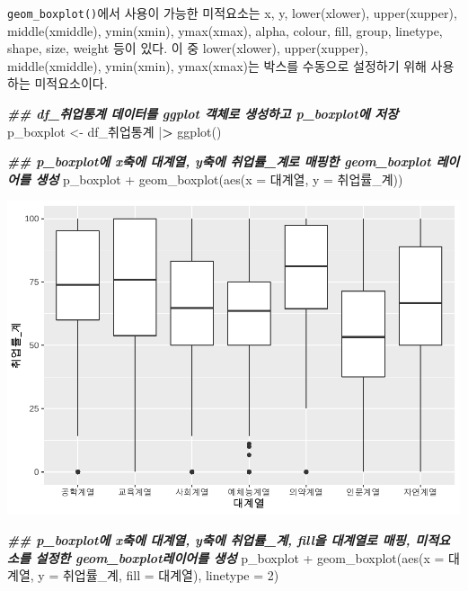 \documentclass[
]{article}
\newenvironment{Shaded}{\begin{snugshade}}{\end{snugshade}}
\newcommand{\AttributeTok}[1]{\textcolor[rgb]{0.77,0.63,0.00}{#1}}
\newcommand{\DecValTok}[1]{\textcolor[rgb]{0.00,0.00,0.81}{#1}}
\newcommand{\DocumentationTok}[1]{\textcolor[rgb]{0.56,0.35,0.01}{\textbf{\textit{#1}}}}
\newcommand{\ErrorTok}[1]{\textcolor[rgb]{0.64,0.00,0.00}{\textbf{#1}}}
\newcommand{\FunctionTok}[1]{\textcolor[rgb]{0.00,0.00,0.00}{#1}}
\newcommand{\NormalTok}[1]{#1}
\newcommand{\OtherTok}[1]{\textcolor[rgb]{0.56,0.35,0.01}{#1}}
\newcommand{\SpecialCharTok}[1]{\textcolor[rgb]{0.00,0.00,0.00}{#1}}
\begin{document}
\texttt{geom\_boxplot()}에서 사용이 가능한 미적요소는 x, y, lower(xlower), upper(xupper), middle(xmiddle), ymin(xmin), ymax(xmax), alpha, colour, fill, group, linetype, shape, size, weight 등이 있다. 이 중 lower(xlower), upper(xupper), middle(xmiddle), ymin(xmin), ymax(xmax)는 박스를 수동으로 설정하기 위해 사용하는 미적요소이다.

\begin{Shaded}
\begin{Highlighting}[]
\DocumentationTok{\#\#  df\_취업통계 데이터를 ggplot 객체로 생성하고 p\_boxplot에 저장}
\NormalTok{p\_boxplot }\OtherTok{\textless{}{-}}\NormalTok{ df\_취업통계 }\SpecialCharTok{|}\ErrorTok{\textgreater{}}
  \FunctionTok{ggplot}\NormalTok{()}

\DocumentationTok{\#\# p\_boxplot에 x축에 대계열, y축에 취업률\_계로 매핑한 geom\_boxplot 레이어를 생성}
\NormalTok{p\_boxplot }\SpecialCharTok{+} 
  \FunctionTok{geom\_boxplot}\NormalTok{(}\FunctionTok{aes}\NormalTok{(}\AttributeTok{x =}\NormalTok{ 대계열, }\AttributeTok{y =}\NormalTok{ 취업률\_계)) }
\end{Highlighting}
\end{Shaded}

\includegraphics{chap3_files/figure-latex/unnamed-chunk-38-1.pdf}

\begin{Shaded}
\begin{Highlighting}[]
\DocumentationTok{\#\# p\_boxplot에 x축에 대계열, y축에 취업률\_계, fill을 대계열로 매핑, 미적요소를 설정한 geom\_boxplot레이어를 생성}
\NormalTok{p\_boxplot }\SpecialCharTok{+} 
  \FunctionTok{geom\_boxplot}\NormalTok{(}\FunctionTok{aes}\NormalTok{(}\AttributeTok{x =}\NormalTok{ 대계열, }\AttributeTok{y =}\NormalTok{ 취업률\_계, }\AttributeTok{fill =}\NormalTok{ 대계열), }\AttributeTok{linetype =} \DecValTok{2}\NormalTok{) }
\end{Highlighting}
\end{Shaded}
\end{document}
